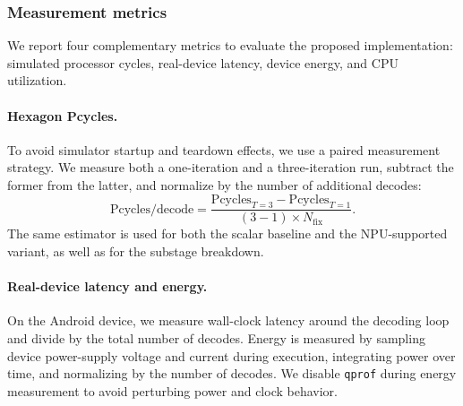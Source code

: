 
\subsubsection{Measurement metrics}
We report four complementary metrics to evaluate the proposed implementation:
simulated processor cycles, real-device latency, device energy, and CPU
utilization.

\paragraph{Hexagon Pcycles.}
To avoid simulator startup and teardown effects, we use a paired measurement
strategy. We measure both a one-iteration and a three-iteration run, subtract the
former from the latter, and normalize by the number of additional decodes:
\[
    \mathrm{Pcycles/decode}
    =
    \frac{
        \mathrm{Pcycles}_{T=3}
        -
        \mathrm{Pcycles}_{T=1}
    }{
        (3-1) \times N_{\mathrm{fix}}
    } .
\]
The same estimator is used for both the scalar baseline and the NPU-supported
variant, as well as for the substage breakdown.

\paragraph{Real-device latency and energy.}
On the Android device, we measure wall-clock latency around the decoding loop
and divide by the total number of decodes. Energy is measured by sampling device
power-supply voltage and current during execution, integrating power over time,
and normalizing by the number of decodes. We disable \texttt{qprof} during
energy measurement to avoid perturbing power and clock behavior.

